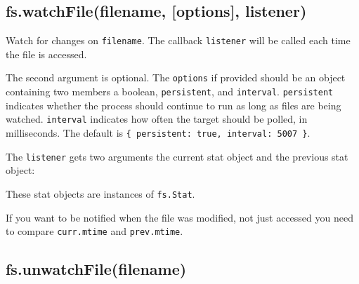 \subsection{fs.watchFile(filename, {[}options{]}, listener)}

\begin{Shaded}
\begin{Highlighting}[]
\NormalTok{: } \NormalTok{- }  
\end{Highlighting}
\end{Shaded}

Watch for changes on \texttt{filename}. The callback \texttt{listener}
will be called each time the file is accessed.

The second argument is optional. The \texttt{options} if provided should
be an object containing two members a boolean, \texttt{persistent}, and
\texttt{interval}. \texttt{persistent} indicates whether the process
should continue to run as long as files are being watched.
\texttt{interval} indicates how often the target should be polled, in
milliseconds. The default is
\texttt{\{ persistent: true, interval: 5007 \}}.

The \texttt{listener} gets two arguments the current stat object and the
previous stat object:

\begin{Shaded}
\begin{Highlighting}[]
\NormalTok{(}\NormalTok{, } 
  \NormalTok{(} \NormalTok{+ }\NormalTok{);}
  \NormalTok{(} \NormalTok{+ }\NormalTok{);}
\NormalTok{\});}
\end{Highlighting}
\end{Shaded}

These stat objects are instances of \texttt{fs.Stat}.

If you want to be notified when the file was modified, not just accessed
you need to compare \texttt{curr.mtime} and \texttt{prev.mtime}.

\subsection{fs.unwatchFile(filename)}

